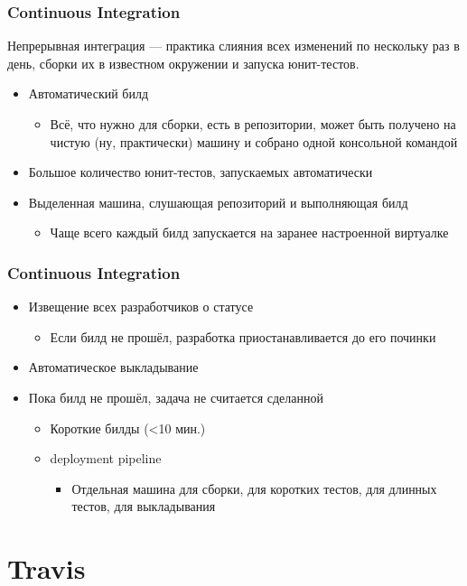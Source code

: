 \documentclass[xetex,mathserif,serif]{beamer}
\begin{document}
	\begin{frame}
		\frametitle{Continuous Integration}
		Непрерывная интеграция --- практика слияния всех изменений по нескольку раз в день, сборки их в известном окружении и запуска юнит-тестов.
		\begin{itemize}
			\item Автоматический билд
			\begin{itemize}
				\item Всё, что нужно для сборки, есть в репозитории, может быть получено на чистую (ну, практически) машину и собрано одной консольной командой
			\end{itemize}
			\item Большое количество юнит-тестов, запускаемых автоматически
			\item Выделенная машина, слушающая репозиторий и выполняющая билд
			\begin{itemize}
				\item Чаще всего каждый билд запускается на заранее настроенной виртуалке
			\end{itemize}
		\end{itemize}
	\end{frame}

	\begin{frame}
		\frametitle{Continuous Integration}
		\begin{itemize}
			\item Извещение всех разработчиков о статусе
			\begin{itemize}
				\item Если билд не прошёл, разработка приостанавливается до его починки
			\end{itemize}
			\item Автоматическое выкладывание
			\item Пока билд не прошёл, задача не считается сделанной
			\begin{itemize}
				\item Короткие билды (<10 мин.)
				\item deployment pipeline
				\begin{itemize}
					\item Отдельная машина для сборки, для коротких тестов, для длинных тестов, для выкладывания
				\end{itemize}
			\end{itemize}
		\end{itemize}
	\end{frame}

	\section{Travis}
\end{document}
